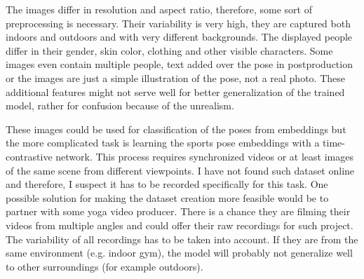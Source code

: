 The images differ in resolution and aspect ratio, therefore, some sort of preprocessing is necessary. Their variability is very high, they are captured both indoors and outdoors and with very different backgrounds. The displayed people differ in their gender, skin color, clothing and other visible characters. Some images even contain multiple people, text added over the pose in postproduction or the images are just a simple illustration of the pose, not a real photo. These additional features might not serve well for better generalization of the trained model, rather for confusion because of the unrealism.

These images could be used for classification of the poses from embeddings but the more complicated task is learning the sports pose embeddings with a time-contrastive network. This process requires synchronized videos or at least images of the same scene from different viewpoints. I have not found such dataset online and therefore, I suspect it has to be recorded specifically for this task. One possible solution for making the dataset creation more feasible would be to partner with some yoga video producer. There is a chance they are filming their videos from multiple angles and could offer their raw recordings for such project. The variability of all recordings has to be taken into account. If they are from the same environment (e.g. indoor gym), the model will probably not generalize well to other surroundings (for example outdoors).
